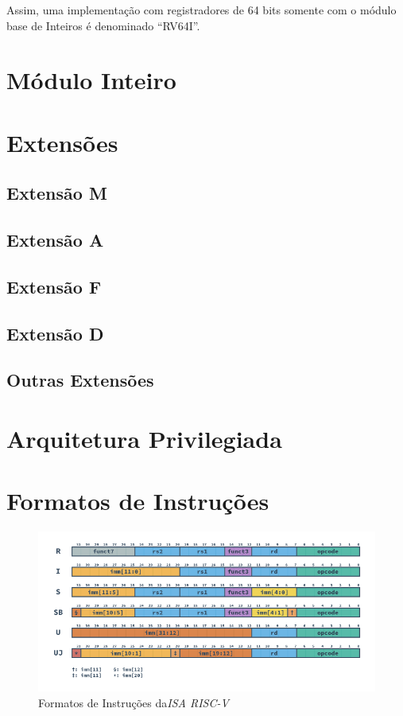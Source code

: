 {
    Assim, uma implementação com registradores de 64 bits somente com o
    módulo base de Inteiros é denominado ``RV64I''.
}


\section{Módulo Inteiro}
{}


\section{Extensões}
    \subsection{Extensão M}
    {}


    \subsection{Extensão A}
    {}


    \subsection{Extensão F}
    {}


    \subsection{Extensão D}
    {}


    \subsection{Outras Extensões}
    {}

\section{Arquitetura Privilegiada}
{}


\section{Formatos de Instruções}
{}

\begin{figure}[H]
\centering
    \includegraphics[width=1\linewidth]{../images/RV_Formats.png}
    \caption{Formatos de Instruções da\textit{ISA RISC-V}
        }\label{fig:riscv_formats}
\end{figure}


